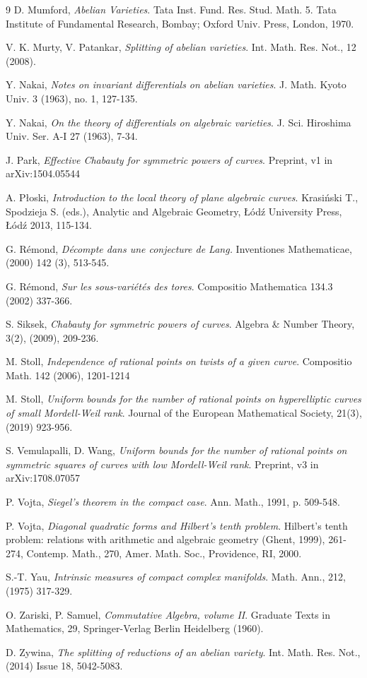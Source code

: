 \documentclass[11pt]{amsart}
\theoremstyle{remark}
\numberwithin{equation}{section}
\begin{document}
\begin{thebibliography}{9}
 D. Mumford, \emph{Abelian Varieties}. Tata Inst. Fund. Res. Stud. Math. 5. Tata Institute of Fundamental Research, Bombay; Oxford Univ. Press, London, 1970.


 V. K. Murty, V. Patankar, \emph{Splitting of abelian varieties}. Int. Math. Res. Not., 12 (2008).

 Y. Nakai, \emph{Notes on invariant differentials on abelian varieties}. J. Math. Kyoto Univ. 3 (1963), no. 1, 127-135. 

 Y. Nakai, \emph{On the theory of differentials on algebraic varieties}. J. Sci. Hiroshima Univ. Ser. A-I 27 (1963),  7-34. 

 J. Park, \emph{Effective Chabauty for symmetric powers of curves}. Preprint, v1 in arXiv:1504.05544

 A. P\l{}oski, \emph{Introduction to the local theory of plane algebraic curves}. Krasi\'nski T., Spodzieja S. (eds.), Analytic and Algebraic Geometry, \L\'od\'z University Press, \L\'od\'z 2013, 115-134.

 G. R\'emond,  \emph{D\'ecompte dans une conjecture de Lang.} Inventiones Mathematicae, (2000) 142 (3),  513-545.

 G. R\'emond, \emph{Sur les sous-vari\'et\'es des tores}. Compositio Mathematica 134.3 (2002) 337-366.


 S. Siksek, \emph{Chabauty for symmetric powers of curves}. Algebra \& Number Theory,  3(2), (2009),  209-236.


 M. Stoll, \emph{Independence of rational points on twists of a given curve}. Compositio Math. 142 (2006), 1201-1214

 M. Stoll, \emph{Uniform bounds for the number of rational points on hyperelliptic curves of small Mordell-Weil rank}. Journal of the European Mathematical Society, 21(3), (2019) 923-956.

 S. Vemulapalli, D. Wang, \emph{Uniform bounds for the number of rational points on symmetric squares of curves with low Mordell-Weil rank}. Preprint, v3 in arXiv:1708.07057

 P. Vojta, \emph{Siegel's theorem in the compact case}. Ann. Math., 1991, p. 509-548.

 P. Vojta, \emph{Diagonal quadratic forms and Hilbert's tenth problem}. Hilbert's tenth problem: relations with arithmetic and algebraic geometry (Ghent, 1999), 261-274, Contemp. Math., 270, Amer. Math. Soc., Providence, RI, 2000.


 S.-T. Yau, \emph{Intrinsic measures of compact complex manifolds}. Math. Ann., 212, (1975) 317-329.

 O. Zariski, P. Samuel, \emph{Commutative Algebra, volume II}. Graduate Texts in Mathematics, 29, Springer-Verlag Berlin Heidelberg (1960).

 D. Zywina, \emph{The splitting of reductions of an abelian variety}. Int. Math. Res. Not., (2014) Issue 18,  5042-5083.

\end{thebibliography}
\end{document}
